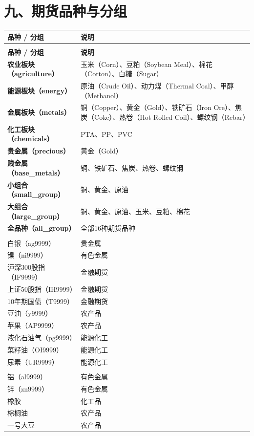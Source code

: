 \section*{九、期货品种与分组}

\begin{longtable}{>{\raggedright\arraybackslash}p{4.5cm} p{9.5cm}}
\toprule
\textbf{品种 / 分组} & \textbf{说明} \\
\midrule
\endfirsthead
\multicolumn{2}{c}{\tablename\ -- 续表} \\
\toprule
\textbf{品种 / 分组} & \textbf{说明} \\
\midrule
\endhead
\bottomrule
\endlastfoot

\textbf{农业板块（agriculture）} & 玉米（Corn）、豆粕（Soybean Meal）、棉花（Cotton）、白糖（Sugar） \\
\textbf{能源板块（energy）} & 原油（Crude Oil）、动力煤（Thermal Coal）、甲醇（Methanol） \\
\textbf{金属板块（metals）} & 铜（Copper）、黄金（Gold）、铁矿石（Iron Ore）、焦炭（Coke）、热卷（Hot Rolled Coil）、螺纹钢（Rebar） \\
\textbf{化工板块（chemicals）} & PTA、PP、PVC \\
\textbf{贵金属（precious）} & 黄金（Gold） \\
\textbf{贱金属（base\_metals）} & 铜、铁矿石、焦炭、热卷、螺纹钢 \\
\textbf{小组合（small\_group）} & 铜、黄金、原油 \\
\textbf{大组合（large\_group）} & 铜、黄金、原油、玉米、豆粕、棉花 \\
\textbf{全品种（all\_group）} & 全部16种期货品种 \\
\addlinespace
\multicolumn{2}{l}{\textit{第六章VWAP实验额外涉及的品种：}} \\
白银（ag9999） & 贵金属 \\
镍（ni9999） & 有色金属 \\
沪深300股指（IF9999） & 金融期货 \\
上证50股指（IH9999） & 金融期货 \\
10年期国债（T9999） & 金融期货 \\
豆油（y9999） & 农产品 \\
苹果（AP9999） & 农产品 \\
液化石油气（pg9999） & 能源化工 \\
菜籽油（OI9999） & 能源化工 \\
尿素（UR9999） & 能源化工 \\
\addlinespace
\multicolumn{2}{l}{\textit{第七章偏序对抗实验额外涉及的品种：}} \\
铝（al9999） & 有色金属 \\
锌（zn9999） & 有色金属 \\
橡胶 & 化工品 \\
棕榈油 & 农产品 \\
一号大豆 & 农产品 \\
\end{longtable}

